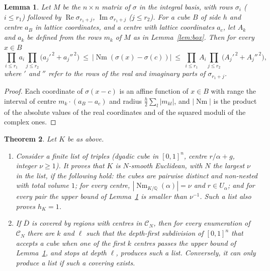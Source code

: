 \documentclass[11pt]{amsart}
\newtheorem{theorem}{Theorem}[section]
\newtheorem{lemma}[theorem]{Lemma}
\theoremstyle{definition}
\theoremstyle{remark}
\numberwithin{equation}{section}
\newcommand{\Q}{\mathbb{Q}}
\newcommand{\Nm}{\operatorname{Nm}}
\begin{document}
\begin{lemma}\label{lem:gen-box}
Let $M$ be the $n\times n$ matrix of $\sigma$ in the integral basis, with rows $\sigma_i$
($i\le r_1$) followed by $\operatorname{Re}\sigma_{r_1+j}$, $\operatorname{Im}\sigma_{r_1+j}$
($j\le r_2$). For a cube $B$ of side $h$ and centre $a_B$ in lattice coordinates, and a centre
with lattice coordinates $a_c$, let $A_k$ and $a_k$ be defined from the rows $m_k$ of $M$ as in
Lemma~\ref{lem:box}. Then for every $x\in B$
\[
  \prod_{i\le r_1}a_i\prod_{j\le r_2}\bigl(a_{j}'^{\,2}+a_{j}''^{\,2}\bigr)\ \le\
  |\Nm(\sigma(x)-\sigma(c))|\ \le\
  \prod_{i\le r_1}A_i\prod_{j\le r_2}\bigl(A_{j}'^{\,2}+A_{j}''^{\,2}\bigr),
\]
where $'$ and $''$ refer to the rows of the real and imaginary parts of $\sigma_{r_1+j}$.
\end{lemma}

\begin{proof}
Each coordinate of $\sigma(x-c)$ is an affine function of $x\in B$ with range the interval of
centre $m_k\cdot(a_B-a_c)$ and radius $\frac h2\sum_l|m_{kl}|$, and $|\Nm|$ is the product of the
absolute values of the real coordinates and of the squared moduli of the complex ones.
\end{proof}

\begin{theorem}\label{thm:gen-cert}
Let $K$ be as above.
\begin{enumerate}
\item[(i)] Consider a finite list of triples (dyadic cube in $[0,1]^n$, centre $r/\alpha+g$,
integer $\nu\ge1$). It proves that $K$ is $N$-smooth Euclidean, with $N$ the largest $\nu$ in
the list, if the following hold: the cubes are pairwise distinct and non-nested with total
volume $1$; for every centre, $|\Nm_{K/\Q}(\alpha)|=\nu$ and $r\in U_\alpha$; and for every pair
the upper bound of Lemma~\ref{lem:gen-box} is smaller than $\nu^{-1}$. Such a list also proves
$h_K=1$.
\item[(ii)] If $\overline D$ is covered by regions with centres in $\mathcal C_N$, then for every
enumeration of $\mathcal C_N$ there are $k$ and $\ell$ such that the depth-first subdivision of
$[0,1]^n$ that accepts a cube when one of the first $k$ centres passes the upper bound of
Lemma~\ref{lem:gen-box}, and stops at depth $\ell$, produces such a list. Conversely, it can
only produce a list if such a covering exists.
\end{enumerate}
\end{theorem}
\end{document}
